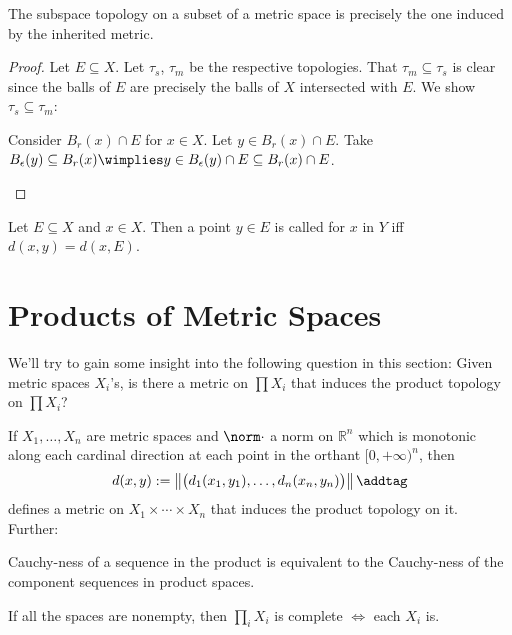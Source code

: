 	
	\begin{lem}
		The subspace topology on a subset of a metric space is precisely the one induced by the inherited metric.
	\end{lem}
	
	\begin{proof}
		Let $E\subseteq X$. Let $\tau_s$, $\tau_m$ be the respective topologies. That $\tau_m\subseteq \tau_s$ is clear since the balls of $E$ are precisely the balls of $X$ intersected with $E$. We show $\tau_s\subseteq \tau_m$:
		\begin{subproof}
			Consider $B_r(x)\cap E$ for $x\in X$. Let $y\in B_r(x)\cap E$. Take $B_\epsilon(y)\subseteq B_r(x)\wimplies y\in B_\epsilon(y)\cap E\subseteq B_r(x)\cap E$.\qedhere
		\end{subproof}
	\end{proof}
	
	Let $E\subseteq X$ and $x\in X$. Then a point $y\in E$ is called  for $x$ in $Y$ iff $d(x, y) = d(x, E)$.
	
	
	
	
\section{Products of Metric Spaces}

	We'll try to gain some insight into the following question in this section: Given metric spaces $X_i$'s, is there a metric on $\prod X_i$ that induces the product topology on $\prod X_i$?
	
	\begin{prp}\label{PRP: finite prod of metr spaces is metrizable}
		If $X_1, \ldots, X_n$ are metric spaces and $\norm\cdot$ a norm on $\mathbb R^n$ which is monotonic along each cardinal direction at each point in the orthant $[0, +\infty)^n$, then
		\[
		d(x, y) := \left\Vert \bigl(d_1(x_1, y_1), \ldots, d_n(x_n, y_n)\bigr) \right\Vert\addtag\label{EQN: metric on finite product}
		\]
		defines a metric on $X_1\times\cdots\times X_n$ that induces the product topology on it. Further:
		\begin{mylist}
			\item\label{PRPi: finite prod of metr spaces is metrizable} Cauchy-ness of a sequence in the product is equivalent to the Cauchy-ness of the component sequences in product spaces.
			
			\item\label{PRPii: finite prod of metr spaces is metrizable} If all the spaces are nonempty, then $\prod_i X_i$ is complete $\iff$ each $X_i$ is.
		\end{mylist}
	\end{prp}
	
